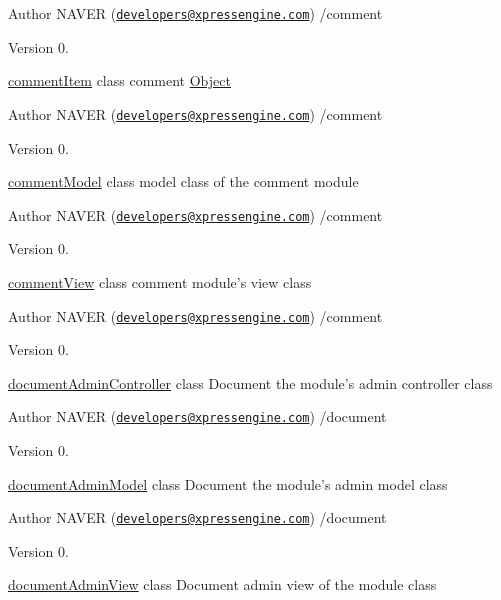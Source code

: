 \begin{DoxyAuthor}{Author}
N\+A\+V\+E\+R (\href{mailto:developers@xpressengine.com}{\tt developers@xpressengine.\+com}) /comment 
\end{DoxyAuthor}
\begin{DoxyVersion}{Version}
0.
\end{DoxyVersion}
\hyperlink{classcommentItem}{comment\+Item} class comment \hyperlink{classObject}{Object}

\begin{DoxyAuthor}{Author}
N\+A\+V\+E\+R (\href{mailto:developers@xpressengine.com}{\tt developers@xpressengine.\+com}) /comment 
\end{DoxyAuthor}
\begin{DoxyVersion}{Version}
0.
\end{DoxyVersion}
\hyperlink{classcommentModel}{comment\+Model} class model class of the comment module

\begin{DoxyAuthor}{Author}
N\+A\+V\+E\+R (\href{mailto:developers@xpressengine.com}{\tt developers@xpressengine.\+com}) /comment 
\end{DoxyAuthor}
\begin{DoxyVersion}{Version}
0.
\end{DoxyVersion}
\hyperlink{classcommentView}{comment\+View} class comment module's view class

\begin{DoxyAuthor}{Author}
N\+A\+V\+E\+R (\href{mailto:developers@xpressengine.com}{\tt developers@xpressengine.\+com}) /comment 
\end{DoxyAuthor}
\begin{DoxyVersion}{Version}
0.
\end{DoxyVersion}
\hyperlink{classdocumentAdminController}{document\+Admin\+Controller} class Document the module's admin controller class

\begin{DoxyAuthor}{Author}
N\+A\+V\+E\+R (\href{mailto:developers@xpressengine.com}{\tt developers@xpressengine.\+com}) /document 
\end{DoxyAuthor}
\begin{DoxyVersion}{Version}
0.
\end{DoxyVersion}
\hyperlink{classdocumentAdminModel}{document\+Admin\+Model} class Document the module's admin model class

\begin{DoxyAuthor}{Author}
N\+A\+V\+E\+R (\href{mailto:developers@xpressengine.com}{\tt developers@xpressengine.\+com}) /document 
\end{DoxyAuthor}
\begin{DoxyVersion}{Version}
0.
\end{DoxyVersion}
\hyperlink{classdocumentAdminView}{document\+Admin\+View} class Document admin view of the module class

